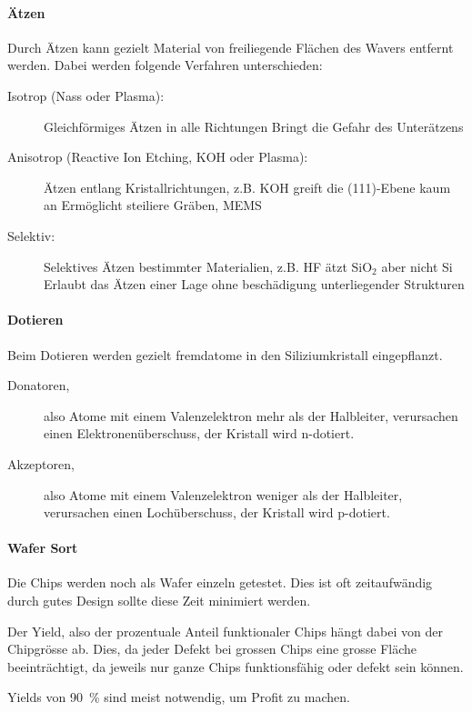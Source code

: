 \paragraph{Ätzen}
Durch Ätzen kann gezielt Material von freiliegende Flächen des Wavers entfernt werden.
Dabei werden folgende Verfahren unterschieden:
\begin{description}
    \item[Isotrop (Nass oder Plasma):] Gleichförmiges Ätzen in alle Richtungen \rightarrow Bringt die Gefahr des Unterätzens
    \item[Anisotrop (Reactive Ion Etching, KOH oder Plasma):] Ätzen entlang Kristallrichtungen, z.B. KOH greift die (111)-Ebene kaum an \rightarrow Ermöglicht steiliere Gräben, MEMS
    \item[Selektiv:] Selektives Ätzen bestimmter Materialien, z.B. HF ätzt SiO$_2$ aber nicht Si \rightarrow Erlaubt das Ätzen einer Lage ohne beschädigung unterliegender Strukturen
\end{description}

\paragraph{Dotieren}
Beim Dotieren werden gezielt fremdatome in den Siliziumkristall eingepflanzt.
\begin{description}
    \item[Donatoren,] also Atome mit einem Valenzelektron mehr als der Halbleiter, verursachen einen Elektronenüberschuss, der Kristall wird n-dotiert.
    \item[Akzeptoren,] also Atome mit einem Valenzelektron weniger als der Halbleiter, verursachen einen Lochüberschuss, der Kristall wird p-dotiert.
\end{description}

\paragraph{Wafer Sort}
Die Chips werden noch als Wafer einzeln getestet. 
Dies ist oft zeitaufwändig \rightarrow durch gutes Design sollte diese Zeit minimiert werden.

Der Yield, also der prozentuale Anteil funktionaler Chips hängt dabei von der Chipgrösse ab.
Dies, da jeder Defekt bei grossen Chips eine grosse Fläche beeinträchtigt, da jeweils nur ganze Chips funktionsfähig oder defekt sein können.

Yields von \qty{90}{\percent} sind meist notwendig, um Profit zu machen.


